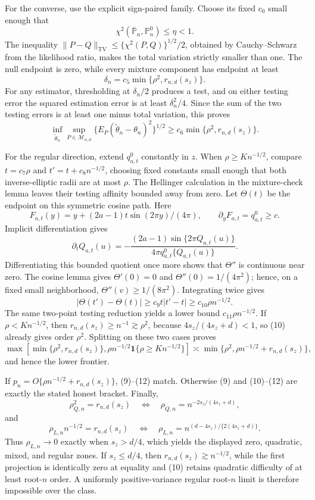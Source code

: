 For the converse, use the explicit sign-paired family.  Choose its fixed \(c_0\) small enough that
\[
\chi^2(\overline{\mathbb P}_n,\mathbb P_n^0)\le\eta<1.
\]
The inequality \(\|P-Q\|_{\mathrm{TV}}\le\{\chi^2(P,Q)\}^{1/2}/2\), obtained by Cauchy--Schwarz from the likelihood ratio, makes the total variation strictly smaller than one.  The null endpoint is zero, while every mixture component has endpoint at least
\[
\delta_n=c_5\min\{\rho^2,r_{n,d}(s_z)\}.
\]
For any estimator, thresholding at \(\delta_n/2\) produces a test, and on either testing error the squared estimation error is at least \(\delta_n^2/4\).  Since the sum of the two testing errors is at least one minus total variation, this proves
\[
\inf_{\widetilde\theta_n}\sup_{P\in\mathcal M_{n,d}}
\{E_P(\widetilde\theta_n-\theta_n)^2\}^{1/2}
\ge c_6\min\{\rho^2,r_{n,d}(s_z)\}.                                      \tag{10}
\]

For the regular direction, extend \(q_{a,t}^0\) constantly in \(z\).  When \(\rho\ge Kn^{-1/2}\), compare \(t=c_7\rho\) and \(t'=t+c_8n^{-1/2}\), choosing fixed constants small enough that both inverse-elliptic radii are at most \(\rho\).  The Hellinger calculation in the mixture-check lemma leaves their testing affinity bounded away from zero.  Let \(\Theta(t)\) be the endpoint on this symmetric cosine path.  Here
\[
F_{a,t}(y)=y+(2a-1)t\sin(2\pi y)/(4\pi),
\qquad \partial_yF_{a,t}=q_{a,t}^0\ge c.
\]
Implicit differentiation gives
\[
\partial_tQ_{a,t}(u)
=-\frac{(2a-1)\sin\{2\pi Q_{a,t}(u)\}}
{4\pi q_{a,t}^0\{Q_{a,t}(u)\}}.
\]
Differentiating this bounded quotient once more shows that \(\Theta''\) is continuous near zero.  The cosine lemma gives \(\Theta'(0)=0\) and \(\Theta''(0)=1/(4\pi^2)\); hence, on a fixed small neighborhood, \(\Theta''(v)\ge1/(8\pi^2)\).  Integrating twice gives
\[
|\Theta(t')-\Theta(t)|\ge c_9t|t'-t|\ge c_{10}\rho n^{-1/2}.              \tag{11}
\]
The same two-point testing reduction yields a lower bound \(c_{11}\rho n^{-1/2}\).  If \(\rho<Kn^{-1/2}\), then \(r_{n,d}(s_z)\ge n^{-1}\gtrsim\rho^2\), because \(4s_z/(4s_z+d)<1\), so (10) already gives order \(\rho^2\).  Splitting on these two cases proves
\[
\max\!\left[\min\{\rho^2,r_{n,d}(s_z)\},
\rho n^{-1/2}\mathbf1\{\rho\ge Kn^{-1/2}\}\right]
\asymp\min\{\rho^2,\rho n^{-1/2}+r_{n,d}(s_z)\},                         \tag{12}
\]
and hence the lower frontier.

If \(p_n=O\{\rho n^{-1/2}+r_{n,d}(s_z)\}\), (9)--(12) match.  Otherwise (9) and (10)--(12) are exactly the stated honest bracket.  Finally,
\[
\rho_{Q,n}^2=r_{n,d}(s_z)
\quad\Longleftrightarrow\quad
\rho_{Q,n}=n^{-2s_z/(4s_z+d)},
\]
and
\[
\rho_{L,n}n^{-1/2}=r_{n,d}(s_z)
\quad\Longleftrightarrow\quad
\rho_{L,n}=n^{(d-4s_z)/\{2(4s_z+d)\}}.
\]
Thus \(\rho_{L,n}\to0\) exactly when \(s_z>d/4\), which yields the displayed zero, quadratic, mixed, and regular zones.  If \(s_z\le d/4\), then \(r_{n,d}(s_z)\gtrsim n^{-1/2}\), while the first projection is identically zero at equality and (10) retains quadratic difficulty of at least root-\(n\) order.  A uniformly positive-variance regular root-\(n\) limit is therefore impossible over the class.